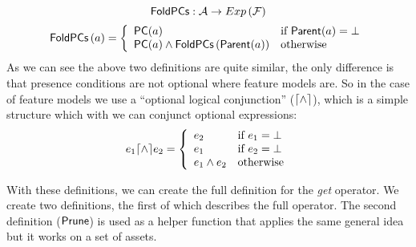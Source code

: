 \[
  {\sf FoldPCs} : \mathcal{A} \rightarrow Exp \left( \mathcal{F} \right)
\]
\[
  {\sf FoldPCs}\left(a\right) =
  \left\{
    \begin{array}{ll}
      {\sf PC}(a) & \text{if } {\sf Parent}(a) = \bot \\
      {\sf PC}(a) \land {\sf FoldPCs}\left( {\sf Parent}(a) \right) & \text{otherwise}
    \end{array}
  \right.
\]
As we can see the above two definitions are quite similar, the only difference
is that presence conditions are not optional where feature models are. So in
the case of feature models we use a ``optional logical conjunction'' 
(\(\lceil \land \rceil\)), which is a simple structure which with we can conjunct
optional expressions:
\[
  e_1 \lceil \land \rceil e_2 =
  \left\{
    \begin{array}{ll}
      e_2 & \text{if } e_1 = \bot \\
      e_1 & \text{if } e_2 = \bot \\
      e_1 \land e_2 & \text{otherwise}
    \end{array}
  \right.
\]

With these definitions, we can create the full definition for the \emph{get}
operator. We create two definitions, the first of which describes the full
operator. The second definition (\({\sf Prune}\)) is used as a helper
function that applies the same general idea but it works on a set of assets.

\begin{center}
\end{center}

